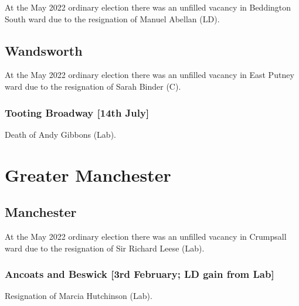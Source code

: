 \documentclass[a4paper,openany]{book}
\begin{document}
\begin{resultsiii}
At the May 2022 ordinary election there was an unfilled vacancy in Beddington South ward due to the resignation of Manuel Abellan (LD).%

\subsection*{Wandsworth}

At the May 2022 ordinary election there was an unfilled vacancy in East Putney ward due to the resignation of Sarah Binder (C).%

\subsubsection*{Tooting Broadway \hspace*{\fill}\nolinebreak[1]%
	\enspace\hspace*{\fill}
	[14th July]}


Death of Andy Gibbons (Lab).

\section{Greater Manchester}

\subsection*{Manchester}

At the May 2022 ordinary election there was an unfilled vacancy in Crumpsall ward due to the resignation of Sir Richard Leese (Lab).%

\subsubsection*{Ancoats and Beswick \hspace*{\fill}\nolinebreak[1]%
	\enspace\hspace*{\fill}
	[3rd February; LD gain from Lab]}


Resignation of Marcia Hutchinson (Lab).


\end{resultsiii}
\end{document}
